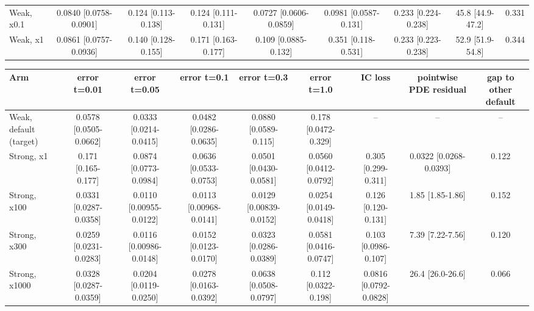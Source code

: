 \begin{tabular}{lcccccccc}
Weak, x0.1 & 0.0840 {\scriptsize[0.0758-0.0901]} & 0.124 {\scriptsize[0.113-0.138]} & 0.124 {\scriptsize[0.111-0.131]} & 0.0727 {\scriptsize[0.0606-0.0859]} & 0.0981 {\scriptsize[0.0587-0.131]} & 0.233 {\scriptsize[0.224-0.238]} & 45.8 {\scriptsize[44.9-47.2]} & 0.331 \\
Weak, x1 & 0.0861 {\scriptsize[0.0757-0.0936]} & 0.140 {\scriptsize[0.128-0.155]} & 0.171 {\scriptsize[0.163-0.177]} & 0.109 {\scriptsize[0.0885-0.132]} & 0.351 {\scriptsize[0.118-0.531]} & 0.233 {\scriptsize[0.223-0.238]} & 52.9 {\scriptsize[51.9-54.8]} & 0.344 \\
\bottomrule
\end{tabular}

\begin{tabular}{lcccccccc}
\toprule
Arm & error t=0.01 & error t=0.05 & error t=0.1 & error t=0.3 & error t=1.0 & IC loss & pointwise PDE residual & gap to other default \\
\midrule
Weak, default (target) & 0.0578 {\scriptsize[0.0505-0.0662]} & 0.0333 {\scriptsize[0.0214-0.0415]} & 0.0482 {\scriptsize[0.0286-0.0635]} & 0.0880 {\scriptsize[0.0589-0.115]} & 0.178 {\scriptsize[0.0472-0.329]} & -- & -- & -- \\
Strong, x1 & 0.171 {\scriptsize[0.165-0.177]} & 0.0874 {\scriptsize[0.0773-0.0984]} & 0.0636 {\scriptsize[0.0533-0.0753]} & 0.0501 {\scriptsize[0.0430-0.0581]} & 0.0560 {\scriptsize[0.0412-0.0792]} & 0.305 {\scriptsize[0.299-0.311]} & 0.0322 {\scriptsize[0.0268-0.0393]} & 0.122 \\
Strong, x100 & 0.0331 {\scriptsize[0.0287-0.0358]} & 0.0110 {\scriptsize[0.00955-0.0122]} & 0.0113 {\scriptsize[0.00968-0.0141]} & 0.0129 {\scriptsize[0.00839-0.0152]} & 0.0254 {\scriptsize[0.0149-0.0418]} & 0.126 {\scriptsize[0.120-0.131]} & 1.85 {\scriptsize[1.85-1.86]} & 0.152 \\
Strong, x300 & 0.0259 {\scriptsize[0.0231-0.0283]} & 0.0116 {\scriptsize[0.00986-0.0148]} & 0.0152 {\scriptsize[0.0123-0.0170]} & 0.0323 {\scriptsize[0.0286-0.0389]} & 0.0581 {\scriptsize[0.0416-0.0747]} & 0.103 {\scriptsize[0.0986-0.107]} & 7.39 {\scriptsize[7.22-7.56]} & 0.120 \\
Strong, x1000 & 0.0328 {\scriptsize[0.0287-0.0359]} & 0.0204 {\scriptsize[0.0119-0.0250]} & 0.0278 {\scriptsize[0.0163-0.0392]} & 0.0638 {\scriptsize[0.0508-0.0797]} & 0.112 {\scriptsize[0.0322-0.198]} & 0.0816 {\scriptsize[0.0792-0.0828]} & 26.4 {\scriptsize[26.0-26.6]} & 0.066 \\

\end{tabular}
